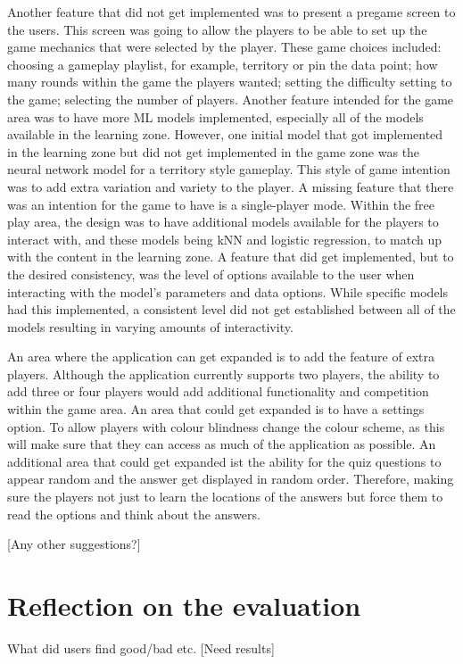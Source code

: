 		Another feature that did not get implemented was to present a pregame screen to the users. This screen was going to allow the players to be able to set up the game mechanics that were selected by the player. These game choices included: choosing a gameplay playlist, for example, territory or pin the data point;  how many rounds within the game the players wanted; setting the difficulty setting to the game; selecting the number of players. Another feature intended for the game area was to have more ML models implemented, especially all of the models available in the learning zone. However, one initial model that got implemented in the learning zone but did not get implemented in the game zone was the neural network model for a territory style gameplay. This style of game intention was to add extra variation and variety to the player. A missing feature that there was an intention for the game to have is a single-player mode. Within the free play area, the design was to have additional models available for the players to interact with, and these models being kNN and logistic regression, to match up with the content in the learning zone. A feature that did get implemented, but to the desired consistency, was the level of options available to the user when interacting with the model's parameters and data options. While specific models had this implemented, a consistent level did not get established between all of the models resulting in varying amounts of interactivity. 

		An area where the application can get expanded is to add the feature of extra players. Although the application currently supports two players, the ability to add three or four players would add additional functionality and competition within the game area. An area that could get expanded is to have a settings option. To allow players with colour blindness change the colour scheme, as this will make sure that they can access as much of the application as possible. An additional area that could get expanded ist the ability for the quiz questions to appear random and the answer get displayed in random order. Therefore, making sure the players not just to learn the locations of the answers but force them to read the options and think about the answers.

		[Any other suggestions?]

	\section{Reflection on the evaluation}
		What did users find good/bad etc.
		[Need results]


